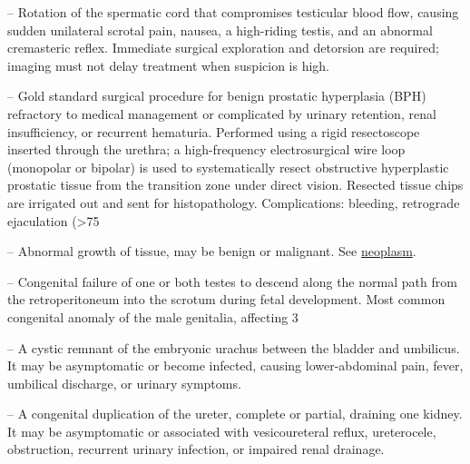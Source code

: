 -- Rotation of the spermatic cord that compromises testicular blood flow, causing sudden unilateral scrotal pain, nausea, a high-riding testis, and an abnormal cremasteric reflex. Immediate surgical exploration and detorsion are required; imaging must not delay treatment when suspicion is high.

-- Gold standard surgical procedure for benign prostatic hyperplasia (BPH) refractory to medical management or complicated by urinary retention, renal insufficiency, or recurrent hematuria. Performed using a rigid resectoscope inserted through the urethra; a high-frequency electrosurgical wire loop (monopolar or bipolar) is used to systematically resect obstructive hyperplastic prostatic tissue from the transition zone under direct vision. Resected tissue chips are irrigated out and sent for histopathology. Complications: bleeding, retrograde ejaculation (>75%

-- Abnormal growth of tissue, may be benign or malignant. See \hyperlink{Neoplasm}{neoplasm}.

-- Congenital failure of one or both testes to descend along the normal path from the retroperitoneum into the scrotum during fetal development. Most common congenital anomaly of the male genitalia, affecting 3%

-- A cystic remnant of the embryonic urachus between the bladder and umbilicus. It may be asymptomatic or become infected, causing lower-abdominal pain, fever, umbilical discharge, or urinary symptoms.

-- A congenital duplication of the ureter, complete or partial, draining one kidney. It may be asymptomatic or associated with vesicoureteral reflux, ureterocele, obstruction, recurrent urinary infection, or impaired renal drainage.

